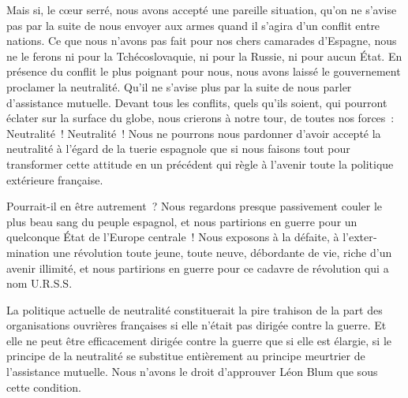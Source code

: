 \documentclass[french,twoside]{book} %
\begin{document}
Mais si, le cœur serré, nous avons accepté une pareille situation, qu'on ne s'avise pas par la suite de nous envoyer aux armes quand il s'agira d'un conflit entre nations. Ce que nous n'avons pas fait pour nos chers camarades d'Espagne, nous ne le ferons ni pour la Tchécoslovaquie, ni pour la Russie, ni pour aucun État. En présence du conflit le plus poignant pour nous, nous avons laissé le gouvernement proclamer la neutralité. Qu'il ne s'avise plus par la suite de nous parler d'assistance mutuelle. Devant tous les conflits, quels qu'ils soient, qui pourront éclater sur la surface du globe, nous crierons à notre tour, de toutes nos forces : Neutralité ! Neutralité ! Nous ne pourrons nous pardonner d'avoir accepté la neutralité à l'égard de la tuerie espagnole que si nous faisons tout pour transformer cette attitude en un précédent qui règle à l'avenir toute la politique extérieure française.\par
Pourrait-il en être autrement ? Nous regardons presque passivement couler le plus beau sang du peuple espagnol, et nous partirions en guerre pour un quelconque État de l'Europe centrale ! Nous exposons à la défaite, à l'exter­mination une révolution toute jeune, toute neuve, débordante de vie, riche d'un avenir illimité, et nous partirions en guerre pour ce cadavre de révolution qui a nom U.R.S.S.\par
La politique actuelle de neutralité constituerait la pire trahison de la part des organisations ouvrières françaises si elle n'était pas dirigée contre la guerre. Et elle ne peut être efficacement dirigée contre la guerre que si elle est élargie, si le principe de la neutralité se substitue entièrement au principe meurtrier de l'assistance mutuelle. Nous n'avons le droit d'approuver Léon Blum que sous cette condition.\par

\begin{center}
\noindent \centerline{}
\end{center}
\end{document}
